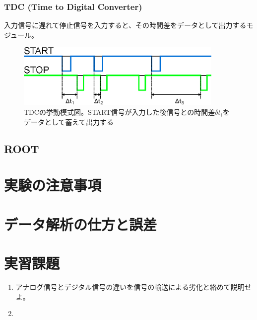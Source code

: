 \documentclass{jarticle}
\begin{document}
  \subsubsection*{TDC (Time to Digital Converter)}

  入力信号に遅れて停止信号を入力すると、その時間差をデータとして出力するモジュール。

	  \begin{figure}[H]
	   \begin{center}
	    \includegraphics[width = 100mm]{./picture/TDC.eps}
	   \end{center}
	   \caption{TDCの挙動模式図。START信号が入力した後信号との時間差$\delta t_{i}$をデータとして蓄えて出力する}
	   \label{Fig:TDC}
	  \end{figure}


  
  	  \subsection{ROOT}
	  
 	  \section{実験の注意事項}
	  
 \section{データ解析の仕方と誤差}
 
 
 	  \section{実習課題}

 	  \begin{enumerate}
	   \item アナログ信号とデジタル信号の違いを信号の輸送による劣化と絡めて説明せよ。
		 
	   \item 
	  \end{enumerate}
	  
	  
	  
\end{document}
